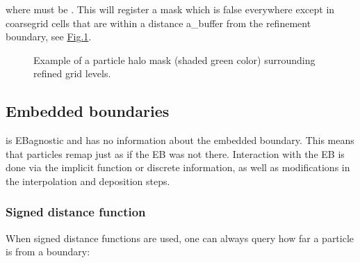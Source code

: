 \documentclass[letterpaper,10pt,english]{sphinxmanual}
\let\sphinxpxdimen\pdfpxdimen\else\newdimen\sphinxpxdimen
\begin{document}
\sphinxAtStartPar
where  must be .
This will register a mask which is false everywhere except in coarse\sphinxhyphen{}grid cells that are within a distance a\_buffer from the refinement boundary, see \hyperref[\detokenize{Source/Particles:fig-halomask}]{Fig.\@ \ref{\detokenize{Source/Particles:fig-halomask}}}.

\begin{figure}[htb]
\centering
\capstart

\noindent\sphinxincludegraphics[width=360\sphinxpxdimen]{{HaloMask}.png}
\caption{Example of a particle halo mask (shaded green color) surrounding refined grid levels.}\label{\detokenize{Source/Particles:id2}}\label{\detokenize{Source/Particles:fig-halomask}}\end{figure}


\subsection{Embedded boundaries}
\label{\detokenize{Source/Particles:embedded-boundaries}}
\sphinxAtStartPar
{} is EB\sphinxhyphen{}agnostic and has no information about the embedded boundary.
This means that particles remap just as if the EB was not there.
Interaction with the EB is done via the implicit function or discrete information, as well as modifications in the interpolation and deposition steps.


\subsubsection{Signed distance function}
\label{\detokenize{Source/Particles:signed-distance-function}}
\sphinxAtStartPar
When signed distance functions are used, one can always query how far a particle is from a boundary:

\begin{sphinxVerbatim}[commandchars=\\\{\},formatcom=\scriptsize]
 
 

    
                
       

       
\end{sphinxVerbatim}
\end{document}
